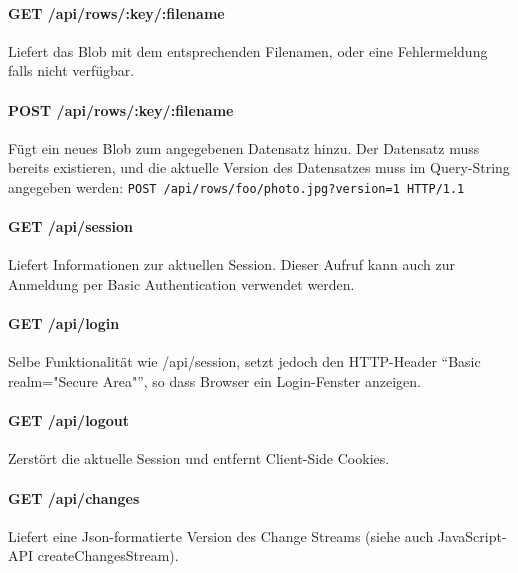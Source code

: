 
\paragraph{GET /api/rows/:key/:filename}
Liefert das Blob mit dem entsprechenden Filenamen, oder eine Fehlermeldung falls nicht verfügbar.

\paragraph{POST /api/rows/:key/:filename}
Fügt ein neues Blob zum angegebenen Datensatz hinzu. Der Datensatz muss bereits existieren, und die aktuelle Version des Datensatzes muss im Query-String angegeben werden: \texttt{POST /api/rows/foo/photo.jpg?version=1 HTTP/1.1}

\paragraph{GET /api/session}
Liefert Informationen zur aktuellen Session. Dieser Aufruf kann auch zur Anmeldung per Basic Authentication verwendet werden.

\paragraph{GET /api/login}
Selbe Funktionalität wie /api/session, setzt jedoch den HTTP-Header ``Basic realm="Secure Area"'', so dass Browser ein Login-Fenster anzeigen.

\paragraph{GET /api/logout}
Zerstört die aktuelle Session und entfernt Client-Side Cookies.

\paragraph{GET /api/changes}
Liefert eine Json-formatierte Version des Change Streams (siehe auch JavaScript-API createChangesStream).

